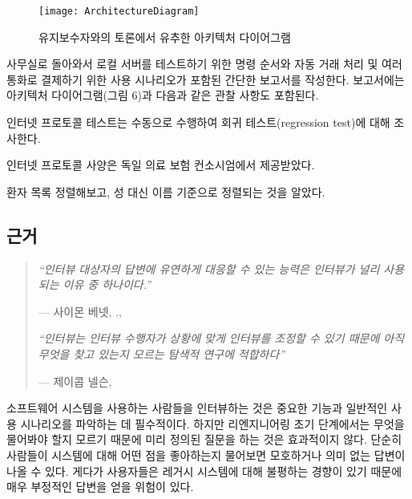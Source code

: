 \documentclass[a4paper,10pt,twoside]{book}
\begin{document}
\begin{figure}
\begin{center}
\texttt{[image: ArchitectureDiagram]}
\caption{유지보수자와의 토론에서 유추한 아키텍처 다이어그램}
\end{center}
\end{figure}

사무실로 돌아와서 로컬 서버를 테스트하기 위한 명령 순서와 자동 거래 처리 및 여러 통화로 결제하기 위한 사용 시나리오가 포함된 간단한 보고서를 작성한다. 보고서에는 아키텍처 다이어그램(그림 6)과 다음과 같은 관찰 사항도 포함된다.

\begin{bulletlist}
  \item 인터넷 프로토콜 테스트는 수동으로 수행하여 회귀 테스트(regression test)에 대해 조사한다.

  \item 인터넷 프로토콜 사양은 독일 의료 보험 컨소시엄에서 제공받았다.

  \item 환자 목록 정렬해보고, 성 대신 이름 기준으로 정렬되는 것을 알았다.
\end{bulletlist}

\subsection*{근거}

\begin{quotation}
\noindent
\emph{``인터뷰 대상자의 답변에 유연하게 대응할 수 있는 능력은 인터뷰가 널리 사용되는 이유 중 하나이다.''}

\hfill --- 사이몬 베넷, \etal., \cite{Benn99a}

\noindent
\emph{``인터뷰는 인터뷰 수행자가 상황에 맞게 인터뷰를 조정할 수 있기 때문에 아직 무엇을 찾고 있는지 모르는 탐색적 연구에 적합하다''}

\hfill --- 제이콥 넬슨, \cite{Niel93b}
\end{quotation}

소프트웨어 시스템을 사용하는 사람들을 인터뷰하는 것은 중요한 기능과 일반적인 사용 시나리오를 파악하는 데 필수적이다. 하지만 리엔지니어링 초기 단계에서는 무엇을 물어봐야 할지 모르기 때문에 미리 정의된 질문을 하는 것은 효과적이지 않다. 단순히 사람들이 시스템에 대해 어떤 점을 좋아하는지 물어보면 모호하거나 의미 없는 답변이 나올 수 있다. 게다가 사용자들은 레거시 시스템에 대해 불평하는 경향이 있기 때문에 매우 부정적인 답변을 얻을 위험이 있다. 
\end{document}
